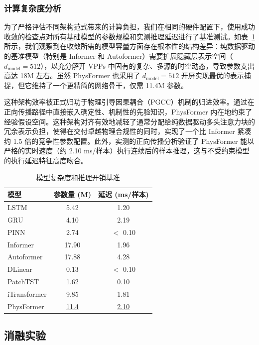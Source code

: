 \subsubsection{计算复杂度分析}
\label{subsec:overhead}

为了严格评估不同架构范式带来的计算负担，我们在相同的硬件配置下，使用成功收敛的检查点对所有基础模型的参数规模和实测推理延迟进行了基准测试。如表~\ref{tab:overhead}所示，我们观察到在收敛所需的模型容量方面存在根本性的结构差异：纯数据驱动的基准模型（特别是 Informer 和 Autoformer）需要扩展隐藏层表示空间（$d_\text{model}=512$），以充分解开 VPPs 中固有的复杂、多源的时空动态，导致参数支出高达 18M 左右。虽然 PhysFormer 也采用了 $d_\text{model}=512$ 开屏实现最优的表示捕捉，但它维持了一个更精简的网络骨干，仅需 11.4M 参数。

这种架构效率被正式归功于物理引导因果耦合（PGCC）机制的归进效率。通过在正向传播路径中直接嵌入确定性、机制性的先验知识，PhysFormer 内在地约束了经验假设空间。这种架构对齐有效地减轻了通常分配给纯数据驱动多头注意力块的冗余表示负担，使得在交付卓越物理合规性的同时，实现了一个比 Informer 紧凑约 1.5 倍的竞争性参数配置。此外，实测的正向传播分析验证了 PhysFormer 能以严格的实时速度（约 2.10 ms/样本）执行连续后的样本推理，这与不受约束模型的执行延迟特征高度吻合。

\begin{table}[htbp]
\centering
\caption{模型复杂度和推理开销基准}
\label{tab:overhead}
\footnotesize
\setlength{\tabcolsep}{2pt}
\begin{tabular*}{\columnwidth}{@{\extracolsep{\fill}}lcc@{}}
\toprule
模型 & 参数量 (M) & 延迟 (ms/样本) \\
\midrule
LSTM & 5.42 & 1.20 \\
GRU & 4.10 & 2.19 \\
PINN & 2.74 & $<$ 0.10 \\
Informer & 17.90 & 1.96 \\
Autoformer & 17.88 & 4.28 \\
DLinear & 0.13 & $<$ 0.10 \\
PatchTST & 1.62 & 0.10 \\
iTransformer & 9.85 & 1.81 \\
PhysFormer & \underline{11.4} & \underline{2.10} \\
\bottomrule
\end{tabular*}
\end{table}

\subsection{消融实验}
\label{subsec:ablation}

